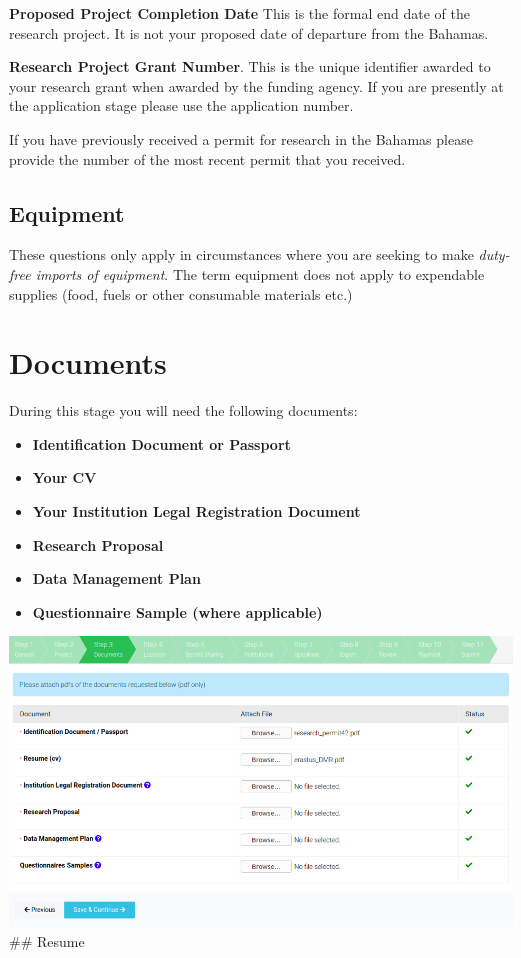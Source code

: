 \documentclass[
]{book}
\providecommand{\tightlist}{%
  \setlength{\itemsep}{0pt}\setlength{\parskip}{0pt}}
\begin{document}
\textbf{Proposed Project Completion Date} This is the formal end date of the research project. It is not your proposed date of departure from the Bahamas.

\textbf{Research Project Grant Number}. This is the unique identifier awarded to your research grant when awarded by the funding agency. If you are presently at the application stage please use the application number.

If you have previously received a permit for research in the Bahamas please provide the number of the most recent permit that you received.

\hypertarget{equipment}{%
\section{Equipment}\label{equipment}}

These questions only apply in circumstances where you are seeking to make \emph{duty-free imports of equipment}. The term equipment does not apply to expendable supplies (food, fuels or other consumable materials etc.)

\hypertarget{documents}{%
\chapter{Documents}\label{documents}}

During this stage you will need the following documents:

\begin{itemize}
\tightlist
\item
  \textbf{Identification Document or Passport}
\item
  \textbf{Your CV}
\item
  \textbf{Your Institution Legal Registration Document}
\item
  \textbf{Research Proposal}
\item
  \textbf{Data Management Plan}
\item
  \textbf{Questionnaire Sample (where applicable)}
\end{itemize}

\includegraphics{images/documents.png}
\#\# Resume
\end{document}
